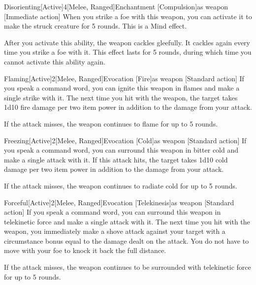             \begin{magicitemdef}{Disorienting}[Active]{4}[Melee, Ranged]{Enchantment [Compulsion]}{as weapon}
                [Immediate action] When you strike a foe with this weapon, you can activate it to make the struck creature \disoriented for 5 rounds.
                This is a Mind effect.

                After you activate this ability, the weapon cackles gleefully.
                It cackles again every time you strike a foe with it.
                This effect lasts for 5 rounds, during which time you cannot activate this ability again.
            \end{magicitemdef}

            \begin{magicitemdef}{Flaming}[Active]{2}[Melee, Ranged]{Evocation [Fire]}{as weapon}
                [Standard action] If you speak a command word, you can ignite this weapon in flames and make a single strike with it. The next time you hit with the weapon, the target takes 1d10 fire damage per two item power in addition to the damage from your attack.

                If the attack misses, the weapon continues to flame for up to 5 rounds.
            \end{magicitemdef}

            \begin{magicitemdef}{Freezing}[Active]{2}[Melee, Ranged]{Evocation [Cold]}{as weapon}
                [Standard action] If you speak a command word, you can surround this weapon in bitter cold and make a single attack with it. If this attack hits, the target takes 1d10 cold damage per two item power in addition to the damage from your attack.

                If the attack misses, the weapon continues to radiate cold for up to 5 rounds.
            \end{magicitemdef}

            \begin{magicitemdef}{Forceful}[Active]{2}[Melee, Ranged]{Evocation [Telekinesis]}{as weapon}
                [Standard action] If you speak a command word, you can surround this weapon in telekinetic force and make a single attack with it. The next time you hit with the weapon, you immediately make a shove attack against your target with a circumstance bonus equal to the damage dealt on the attack. You do not have to move with your foe to knock it back the full distance.

                If the attack misses, the weapon continues to be surrounded with telekinetic force for up to 5 rounds.
            \end{magicitemdef}

